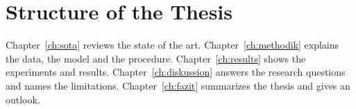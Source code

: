 \section{Structure of the Thesis}
\label{sec:aufbau}
Chapter~\ref{ch:sota} reviews the state of the art. Chapter~\ref{ch:methodik}
explains the data, the model and the procedure. Chapter~\ref{ch:results} shows
the experiments and results. Chapter~\ref{ch:diskussion} answers the research
questions and names the limitations. Chapter~\ref{ch:fazit} summarizes the
thesis and gives an outlook.
